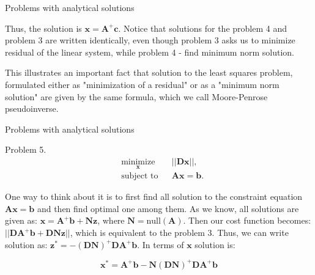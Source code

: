 \documentclass{beamer}
\begin{document}
\begin{frame}{Problems with analytical solutions}
\begin{flushleft}


Thus, the solution is  $\mathbf{x} = \mathbf{A}^+\mathbf{c}$. Notice that solutions for the problem 4 and problem 3 are written identically, even though problem 3 asks us to minimize residual of the linear system, while problem 4 - find minimum norm solution. 

\bigskip

This illustrates an important fact that solution to the least squares problem, formulated either as "minimization of a residual" or as a "minimum norm solution" are given by the same formula, which we call Moore-Penrose pseudoinverse.


\end{flushleft}
\end{frame}





\begin{frame}{Problems with analytical solutions}
\begin{flushleft}

Problem 5. 
%
\begin{equation}
\begin{aligned}
& \underset{\mathbf{x}}{\text{minimize}}
& & || \mathbf{D}\mathbf{x} ||, \\
& \text{subject to}
& & \mathbf{A} \mathbf{x} = \mathbf{b}.
\end{aligned}
\end{equation}

One way to think about it is to first find all solution to the constraint equation $\mathbf{A} \mathbf{x} = \mathbf{b}$ and then find optimal one among them. As we know, all solutions are given as: $\mathbf{x} = \mathbf{A}^+\mathbf{b} + \mathbf{N}\mathbf{z}$, where $\mathbf{N} = \text{null}(\mathbf{A})$. Then our cost function becomes: $|| \mathbf{D}\mathbf{A}^+\mathbf{b} +  \mathbf{D}\mathbf{N}\mathbf{z} ||$, which is equivalent to the problem 3. Thus, we can write solution as: 
$\mathbf{z}^* = -(\mathbf{D}\mathbf{N})^+ \mathbf{D}\mathbf{A}^+\mathbf{b}$. In terms of $\mathbf{x}$ solution is:

\begin{equation}
    \mathbf{x}^* = \mathbf{A}^+\mathbf{b}-\mathbf{N}(\mathbf{D}\mathbf{N})^+ \mathbf{D}\mathbf{A}^+\mathbf{b}
\end{equation}

\end{flushleft}
\end{frame}
\end{document}
